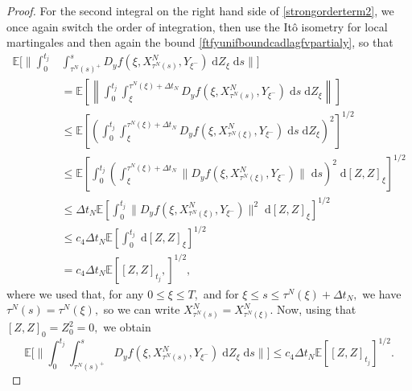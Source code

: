 \documentclass[reqno,12pt]{amsart}
\theoremstyle{plain} %
\theoremstyle{definition} %
\begin{document}
\begin{proof}
    For the second integral on the right hand side of \eqref{strongorderterm2}, we once again switch the order of integration, then use the It\^o isometry for local martingales and then again the bound \eqref{ftfyunifboundcadlagfvpartialy}, so that
    \begin{align*}
        \mathbb{E}\bigg[\bigg\|\int_0^{t_j} & \int_{\tau^N(s)^+}^s D_y f(\xi, X_{\tau^N(s)}^N, Y_{\xi^-}) \;\mathrm{d}Z_\xi\;\mathrm{d}s\bigg\|\bigg] \\
        & = \mathbb{E}\left[\left\|\int_0^{t_j} \int_{\xi}^{\tau^N(\xi) + \Delta t_N} D_y f(\xi, X_{\tau^N(s)}^N, Y_{\xi^-}) \;\mathrm{d}s \;\mathrm{d}Z_\xi\right\|\right] \\
        & \leq \mathbb{E}\left[\left(\int_0^{t_j} \int_{\xi}^{\tau^N(\xi) + \Delta t_N} D_y f(\xi, X_{\tau^N(\xi)}^N, Y_{\xi^-}) \;\mathrm{d}s \;\mathrm{d}Z_\xi\right)^2\right]^{1/2} \\
        & \leq \mathbb{E}\left[\int_0^{t_j} \left(\int_{\xi}^{\tau^N(\xi) + \Delta t_N} \|D_y f(\xi, X_{\tau^N(\xi)}^N, Y_{\xi^-})\| \;\mathrm{d}s\right)^2 \;\mathrm{d}[Z, Z]_\xi\right]^{1/2} \\
        & \leq \Delta t_N\mathbb{E}\left[\int_0^{t_j} \|D_y f(\xi, X_{\tau^N(\xi)}^N, Y_{\xi^-})\|^2 \;\mathrm{d}[Z, Z]_\xi\right]^{1/2} \\
        & \leq c_4\Delta t_N\mathbb{E}\left[\int_0^{t_j} \;\mathrm{d}[Z, Z]_\xi\right]^{1/2} \\
        & = c_4\Delta t_N\mathbb{E}\left[ [Z, Z]_{t_j},\right]^{1/2},
    \end{align*}
    where we used that, for any $0 \leq \xi \leq T,$ and for $\xi \leq s \leq \tau^N(\xi) + \Delta t_N,$ we have $\tau^N(s) = \tau^N(\xi),$ so we can write $X_{\tau^N(s)}^N = X_{\tau^N(\xi)}^N.$ Now, using that $[Z, Z]_0 = Z_0^2 = 0,$ we obtain
    \begin{equation}
        \label{strongorderterm2b}
        \mathbb{E}\bigg[\bigg\|\int_0^{t_j} \int_{\tau^N(s)^+}^s D_y f(\xi, X_{\tau^N(s)}^N, Y_{\xi^-}) \;\mathrm{d}Z_\xi\;\mathrm{d}s\bigg\|\bigg] \leq c_4\Delta t_N\mathbb{E}\left[ [Z, Z]_{t_j}\right]^{1/2}.
    \end{equation}
    

\end{proof}
\end{document}
